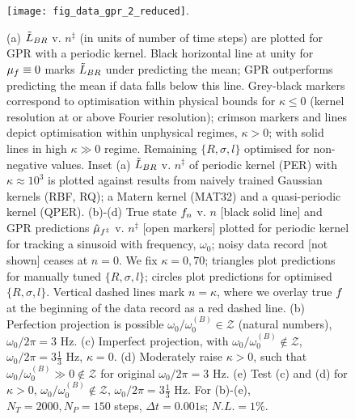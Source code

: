 \begin{figure}
    \texttt{[image: fig\_data\_gpr\_2\_reduced]}. 
    \caption{\label{fig:main:fig_data_gpr} (a) $\tilde{L}_{BR}$ v. $n^\ddagger$ (in units of number of time steps) are plotted for GPR with a periodic kernel. Black horizontal line at unity for $\mu_f \equiv 0$ marks $\tilde{L}_{BR}$ under predicting the mean; GPR outperforms predicting the mean if data falls below this line. Grey-black markers correspond to optimisation within physical bounds for $\kappa \leq 0 $ (kernel resolution at or above Fourier resolution); crimson markers and lines depict optimisation within unphysical regimes, $\kappa >0$; with solid lines in high $\kappa \gg 0$ regime. Remaining  $\{R, \sigma, l\}$ optimised for non-negative values. Inset (a) $\tilde{L}_{BR}$ v. $n^\ddagger$ of periodic kernel (PER) with $\kappa \approx 10^3$ is plotted against results from naively trained Gaussian kernels (RBF, RQ); a Matern kernel (MAT32) and a quasi-periodic kernel (QPER). (b)-(d) True state $f_n$ v. $n$ [black solid line] and GPR predictions $\hat{\mu}_{f^\ddagger}$ v. $n^\ddagger$ [open markers]  plotted for periodic kernel for tracking a sinusoid with frequency, $\omega_0$; noisy data record [not shown] ceases at $n=0$. We fix $\kappa = 0, 70$; triangles plot predictions for manually tuned $\{R, \sigma, l\}$; circles plot predictions for optimised $\{R, \sigma, l\}$. Vertical dashed lines mark $n=\kappa$, where we overlay true $f$ at the beginning of the data record as a red dashed line. (b) Perfection projection is possible $\omega_0 / \omega_0^{(B)} \in \mathcal{Z}$ (natural numbers), $\omega_0/2\pi = 3$ Hz. (c) Imperfect projection, with $\omega_0 / \omega_0^{(B)} \notin \mathcal{Z}$, $\omega_0 / 2 \pi = 3 \frac{1}{3}$ Hz, $\kappa=0$. (d) Moderately raise $\kappa > 0 $, such that $\omega_0 / \omega_0^{(B)} \gg 0 \notin \mathcal{Z}$ for original $ \omega_0 / 2 \pi = 3$ Hz. (e) Test (c) and (d) for $\kappa > 0$, $ \omega_0 / \omega_0^{(B)} \notin \mathcal{Z}$, $\omega_0 / 2 \pi = 3 \frac{1}{3}$ Hz. For (b)-(e), $N_T = 2000, N_P = 150$ steps, $\Delta t = 0.001$s; $N.L.= 1\%$.}    	

\end{figure}
